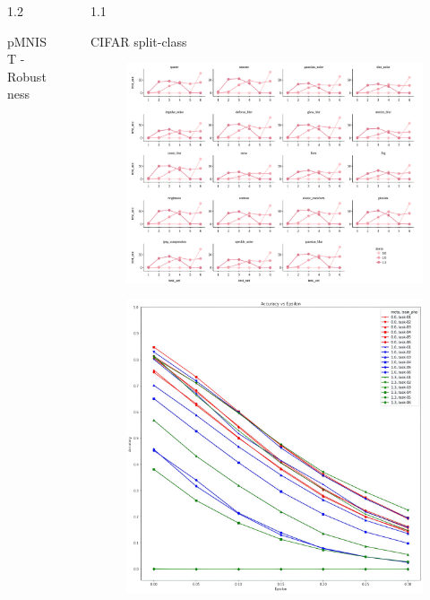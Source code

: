 \documentclass[aspectratio=32, final]{beamer}
\newlength{\sepwidth}
\newlength{\colwidth}
\newcommand{\separatorcolumn}{\begin{column}{\sepwidth}\end{column}}
\begin{document}
\begin{frame}[t]
\begin{columns}[t]
\begin{column}{1.2\colwidth}
\begin{block}{pMNIST - Robustness}
  \end{block}

\end{column}

\separatorcolumn

\begin{column}{1.1\colwidth}

  \begin{block}{CIFAR split-class}
  
  \begin{figure}
      \centering
      \includegraphics[width=1.0\colwidth]{figures/corruption_cifar100.png}
  \end{figure}

    \begin{figure}
      \centering
      \includegraphics[width=0.5\colwidth]{figures/cifar100-fgsm-attack.png}
  \end{figure}
  \end{block}


\end{column}
\end{columns}
\end{frame}
\end{document}
